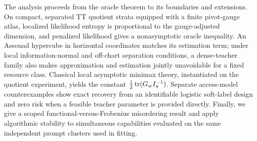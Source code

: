 The analysis proceeds from the oracle theorem to its boundaries and extensions. On compact, separated TT quotient strata equipped with a finite pivot-gauge atlas, localized likelihood entropy is proportional to the gauge-adjusted dimension, and penalized likelihood gives a nonasymptotic oracle inequality. An Assouad hypercube in horizontal coordinates matches its estimation term; under local information-normal and off-chart separation conditions, a dense-teacher family also makes approximation and estimation jointly unavoidable for a fixed resource class. Classical local asymptotic minimax theory, instantiated on the quotient experiment, yields the constant \(\tfrac12\operatorname{tr}(G_w I_\pi^{-1})\). Separate access-model counterexamples show exact recovery from an identifiable logistic soft-label design and zero risk when a feasible teacher parameter is provided directly. Finally, we give a scoped functional-versus-Frobenius misordering result and apply algorithmic stability to simultaneous capabilities evaluated on the same independent prompt clusters used in fitting.

